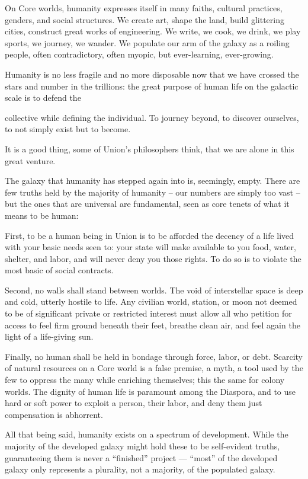 On Core worlds, humanity expresses itself in many faiths, cultural practices, genders, and social
structures. We create art, shape the land, build glittering cities, construct great works of
engineering. We write, we cook, we drink, we play sports, we journey, we wander. We populate
our arm of the galaxy as a roiling people, often contradictory, often myopic, but ever-learning,
ever-growing.


Humanity is no less fragile and no more disposable now that we have crossed the stars and
number in the trillions: the great purpose of human life on the galactic scale is to defend the




collective while defining the individual. To journey beyond, to discover ourselves, to not simply
exist but to become.


It is a good thing, some of Union’s philosophers think, that we are alone in this great venture.


The galaxy that humanity has stepped again into is, seemingly, empty. There are few truths held
by the majority of humanity -- our numbers are simply too vast -- but the ones that are universal
are fundamental, seen as core tenets of what it means to be human:


First, to be a human being in Union is to be afforded the decency of a life lived with your basic
needs seen to: your state will make available to you food, water, shelter, and labor, and will never
deny you those rights. To do so is to violate the most basic of social contracts.


Second, no walls shall stand between worlds. The void of interstellar space is deep and cold,
utterly hostile to life. Any civilian world, station, or moon not deemed to be of significant private
or restricted interest must allow all who petition for access to feel firm ground beneath their feet,
breathe clean air, and feel again the light of a life-giving sun.


Finally, no human shall be held in bondage through force, labor, or debt. Scarcity of natural
resources on a Core world is a false premise, a myth, a tool used by the few to oppress the many
while enriching themselves; this the same for colony worlds. The dignity of human life is
paramount among the Diaspora, and to use hard or soft power to exploit a person, their labor,
and deny them just compensation is abhorrent.


All that being said, humanity exists on a spectrum of development. While the majority of the
developed galaxy might hold these to be self-evident truths, guaranteeing them is never a
“finished” project — “most” of the developed galaxy only represents a plurality, not a majority, of
the populated galaxy.


